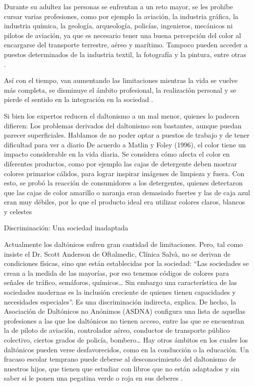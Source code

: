 \documentclass[10pt]{article}
\begin{document}
Durante su adultez las personas se enfrentan a un reto mayor, se les prohíbe cursar varias profesiones, como por ejemplo la aviación, la industria gráfica, la industria química, la geología, arqueología, policías, ingenieros, mecánicos ni pilotos de aviación, ya que es necesario tener una buena percepción del color al encargarse del transporte terrestre, aéreo y marítimo. Tampoco pueden acceder a puestos determinados de la industria textil, la fotografía y la pintura, entre otras \cite{IEEEreferencias:Ref32}\cite{IEEEreferencias:Ref1}.

Así con el tiempo, van aumentando las limitaciones mientras la vida se vuelve más completa, se disminuye el ámbito profesional, la realización personal y se pierde el sentido en la integración en la sociedad \cite{IEEEreferencias:Ref32}.

Si bien los expertos reducen el daltonismo a un mal menor, quienes lo padecen difieren: Los problemas derivados del daltonismo son bastantes, aunque puedan parecer superficiales. Hablamos de no poder optar a puestos de trabajo y de tener dificultad para ver a diario \cite{IEEEreferencias:Ref1}
De acuerdo a Matlin y Foley (1996), el color tiene un impacto considerable en la vida diaria. Se considera cómo afecta el color en diferentes productos, como por ejemplo las cajas de detergente deben mostrar colores primarios cálidos, para lograr inspirar imágenes de limpieza y fuera. Con esto, se probó la reacción de consumidores a los detergentes, quienes detectaron que las cajas de color amarillo o naranja eran demasiado fuertes y las de caja azul eran muy débiles, por lo que el producto ideal era utilizar colores claros, blancos y celestes \cite{IEEEreferencias:Ref32}

Discriminación: Una sociedad inadaptada

Actualmente los daltónicos sufren gran cantidad de limitaciones. Pero, tal como insiste el Dr. Scott Anderson de Oftalmedic, Clínica Salvà, no se derivan de condiciones físicas, sino que están establecidas por la sociedad: “Las sociedades se crean a la medida de las mayorías, por eso tenemos códigos de colores para señales de tráfico, semáforos, químicos… Sin embargo una característica de las sociedades modernas es la inclusión creciente de quienes tienen capacidades y necesidades especiales”. Es una discriminación indirecta, explica. De hecho, la Asociación de Daltónicos no Anónimos (ASDNA) configura una lista de aquellas profesiones a las que los daltónicos no tienen acceso, entre las que se encuentran la de piloto de aviación, controlador aéreo, conductor de transporte público colectivo, ciertos grados de policía, bombero…
Hay otros ámbitos en los cuales los daltónicos pueden verse desfavorecidos, como en la conducción o la educación. Un fracaso escolar temprano puede deberse al desconocimiento del daltonismo de nuestros hijos, que tienen que estudiar con libros que no están adaptados y sin saber si le ponen una pegatina verde o roja en sus deberes \cite{IEEEreferencias:Ref33}.
\end{document}
